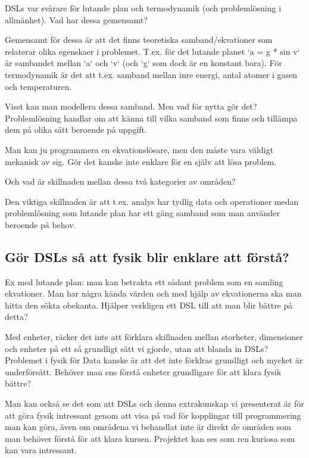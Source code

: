 \newpage

DSLs var svårare för lutande plan och termodynamik (och problemlösning i allmänhet). Vad har dessa gemensamt?

Gemensamt för dessa är att det finns teoretiska samband/ekvationer som relaterar olika egenskaer i problemet. T.ex. för det lutande planet `a = g * sin v` är sambandet mellan `a` och `v` (och `g` som dock är en konstant bara). För termodynamik är det att t.ex. samband mellan inre energi, antal atomer i gasen och temperaturen.

Visst kan man modellera dessa samband. Men vad för nytta gör det? Problemlösning handlar om att känna till vilka samband som finns och tillämpa dem på olika sätt beroende på uppgift.

Man kan ju programmera en ekvationslösare, men den måste vara väldigt mekanisk av sig. Gör det kanske inte enklare för en själv att lösa problem.

Och vad är skillnaden mellan dessa två kategorier av områden?

Den viktiga skillnaden är att t.ex. analys har tydlig data och operationer medan problemlösning som lutande plan har ett gäng samband som man använder beroende på behov.

\subsection{Gör DSLs så att fysik blir enklare att förstå?}

Ex med lutande plan: man kan betrakta ett sådant problem som en samling ekvationer. Man har några kända värden och med hjälp av ekvationerna ska man hitta den sökta obekanta. Hjälper verkligen ett DSL till att man blir bättre på detta?

Med enheter, räcker det inte att förklara skillnaden mellan storheter, dimensioner och enheter på ett så grundligt sätt vi gjorde, utan att blanda in DSLs? Problemet i fysik för Data kanske är att det inte förklras grundligt och mycket är underförsått. Behöver man ens förstå enheter grundligare för att klara fysik bättre?

Man kan också se det som att DSLs och denna extrakunskap vi presenterat är för att göra fysik intressant genom att visa på vad för kopplingar till programmering man kan göra, även om områdena vi behandlat inte är direkt de områden som man behöver förstå för att klara kursen. Projektet kan ses som ren kuriosa som kan vara intressant.